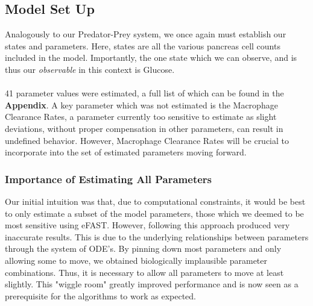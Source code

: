 \subsection{Model Set Up}
Analogously to our Predator-Prey system, we once again must establish our states and parameters. Here, states are all the various pancreas cell counts included in the model. Importantly, the one state which we can observe, and is thus our \emph{observable} in this context is Glucose. \\
\\
41 parameter values were estimated, a full list of which can be found in the \textbf{Appendix}. A key parameter which was not estimated is the Macrophage Clearance Rates, a parameter currently too sensitive to estimate as slight deviations, without proper compensation in other parameters, can result in undefined behavior. However, Macrophage Clearance Rates will be crucial to incorporate into the set of estimated parameters moving forward.

\subsubsection{Importance of Estimating All Parameters}
Our initial intuition was that, due to computational constraints, it would be best to only estimate a subset of the model parameters, those which we deemed to be most sensitive using eFAST. However, following this approach produced very inaccurate results. This is due to the underlying relationships between parameters through the system of ODE's. By pinning down most parameters and only allowing some to move, we obtained biologically implausible parameter combinations. Thus, it is necessary to allow all parameters to move at least slightly. This "wiggle room" greatly improved performance and is now seen as a prerequisite for the algorithms to work as expected.


